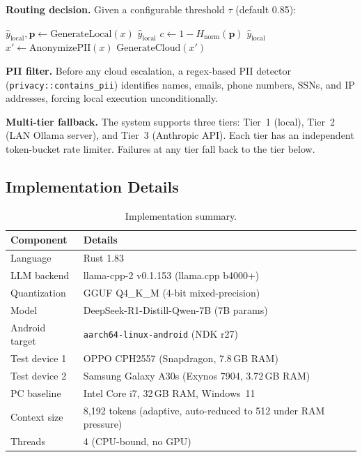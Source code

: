 \documentclass[11pt]{article}
\newcommand{\nanort}{\textsc{NanoRuntime}}
\begin{document}
\textbf{Routing decision.}
Given a configurable threshold $\tau$ (default 0.85):
\begin{algorithm}[H]
\caption{\nanort{} Routing Decision}
\label{alg:routing}
\begin{algorithmic}[1]
\State $\hat{y}_{\text{local}}, \mathbf{p} \gets \text{GenerateLocal}(x)$
 \Return $\hat{y}_{\text{local}}$ \EndIf
\State $c \gets 1 - H_{\text{norm}}(\mathbf{p})$
 \Return $\hat{y}_{\text{local}}$ \EndIf
\State $x' \gets \text{AnonymizePII}(x)$
\State \Return $\text{GenerateCloud}(x')$
\end{algorithmic}
\end{algorithm}

\textbf{PII filter.}
Before any cloud escalation, a regex-based PII detector
(\texttt{privacy::contains\_pii}) identifies names, emails, phone
numbers, SSNs, and IP addresses, forcing local execution unconditionally.

\textbf{Multi-tier fallback.}
The system supports three tiers: Tier~1 (local), Tier~2 (LAN Ollama
server), and Tier~3 (Anthropic API).
Each tier has an independent token-bucket rate limiter.
Failures at any tier fall back to the tier below.

\subsection{Implementation Details}
\label{sec:impl}

\begin{table}[h]
\centering
\caption{Implementation summary.}
\label{tab:impl}
\begin{tabular}{ll}
\toprule
Component & Details \\
\midrule
Language & Rust 1.83 \\
LLM backend & llama-cpp-2 v0.1.153 (llama.cpp b4000+) \\
Quantization & GGUF Q4\_K\_M (4-bit mixed-precision) \\
Model & DeepSeek-R1-Distill-Qwen-7B (7B params) \\
Android target & \texttt{aarch64-linux-android} (NDK r27) \\
Test device 1 & OPPO CPH2557 (Snapdragon, 7.8\,GB RAM) \\
Test device 2 & Samsung Galaxy A30s (Exynos 7904, 3.72\,GB RAM) \\
PC baseline & Intel Core i7, 32\,GB RAM, Windows~11 \\
Context size & 8,192 tokens (adaptive, auto-reduced to 512 under RAM pressure) \\
Threads & 4 (CPU-bound, no GPU) \\
\bottomrule
\end{tabular}
\end{table}
\end{document}
